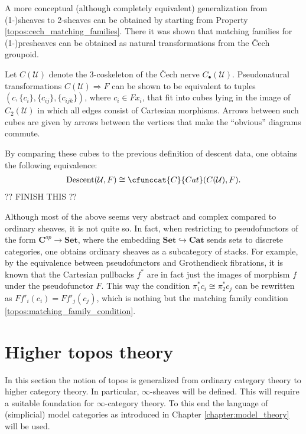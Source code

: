     A more conceptual (although completely equivalent) generalization from (1-)sheaves to 2-sheaves can be obtained by starting from Property \ref{topos:cech_matching_families}. There it was shown that matching families for (1-)presheaves can be obtained as natural transformations from the \v{C}ech groupoid.
    \begin{property}
        Let $C(\mathcal{U})$ denote the 3-coskeleton of the \v{C}ech nerve $C_\bullet(\mathcal{U})$. Pseudonatural transformations $C(\mathcal{U})\Rightarrow F$ can be shown to be equivalent to tuples $(c,\{c_i\},\{c_{ij}\},\{c_{ijk}\})$, where $c_i\in Fx_i$, that fit into cubes lying in the image of $C_2(\mathcal{U})$ in which all edges consist of Cartesian morphisms. Arrows between such cubes are given by arrows between the vertices that make the ``obvious'' diagrams commute.

        By comparing these cubes to the previous definition of descent data, one obtains the following equivalence:
        \begin{gather}
            \mathrm{Descent}(\mathcal{U},F)\cong\cfunccat{C}{Cat}(C(\mathcal{U}),F).
        \end{gather}
        ?? FINISH THIS ??
    \end{property}

    \begin{remark}[1-sheaves]
        Although most of the above seems very abstract and complex compared to ordinary sheaves, it is not quite so. In fact, when restricting to pseudofunctors of the form $\mathbf{C}^{op}\rightarrow\mathbf{Set}$, where the embedding $\mathbf{Set}\hookrightarrow\mathbf{Cat}$ sends sets to discrete categories, one obtains ordinary sheaves as a subcategory of stacks. For example, by the equivalence between pseudofunctors and Grothendieck fibrations, it is known that the Cartesian pullbacks $f^*$ are in fact just the images of morphism $f$ under the pseudofunctor $F$. This way the condition $\pi_1^*c_i\cong\pi^*_2c_j$ can be rewritten as $Ff'_i(c_i)=Ff'_j(c_j)$, which is nothing but the matching family condition \eqref{topos:matching_family_condition}.
    \end{remark}

\section{Higher topos theory}

    In this section the notion of topos is generalized from ordinary category theory to higher category theory. In particular, $\infty$-sheaves will be defined. This will require a suitable foundation for $\infty$-category theory. To this end the language of (simplicial) model categories as introduced in Chapter \ref{chapter:model_theory} will be used.

